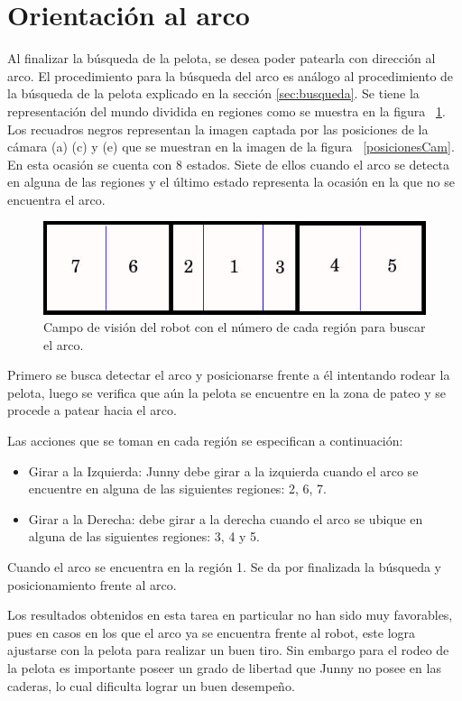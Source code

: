 \section{Orientaci\'on al arco}

Al finalizar la búsqueda de la pelota, se desea poder patearla con dirección al arco. El procedimiento para la búsqueda del arco es an\'alogo al procedimiento de la b\'usqueda de la pelota explicado en la sección \ref{sec:busqueda}.
Se tiene la representación del mundo dividida en regiones como se muestra en la figura ~\ref{divisionCamArco}. Los recuadros negros representan la imagen captada por las posiciones de la cámara (a) (c) y (e) que se muestran en la imagen de la figura ~\ref{posicionesCam}. En esta ocasi\'on se cuenta con 8 estados. Siete de ellos cuando el arco se detecta en alguna de las regiones y el último estado representa la ocasión en la que no se encuentra el arco. 

\begin{figure}[hbtp]
\centering
\includegraphics[scale=0.5]{imagenes/RegionesArco.jpg}
\caption{Campo de visión del robot con el número de cada región para buscar el arco. }
\label{divisionCamArco}
\end{figure}

Primero se busca detectar el arco y posicionarse frente a él intentando rodear la pelota, luego se verifica que a\'un la pelota se encuentre en la zona de pateo y se procede a patear hacia el arco.

Las acciones que se toman en cada regi\'on se especifican a continuación: 
 \begin{itemize}
\item Girar a la Izquierda: Junny debe girar a la izquierda cuando el arco se encuentre en alguna de las siguientes regiones: 2, 6, 7.

\item Girar a la Derecha: debe girar a la derecha cuando el arco se ubique en alguna de las siguientes regiones: 3, 4 y 5. 
\end{itemize}

Cuando el arco se encuentra en la regi\'on 1. Se da por finalizada la búsqueda y posicionamiento frente al arco.  

Los resultados obtenidos en esta tarea en particular no han sido muy favorables, pues en casos en los que el arco ya se encuentra frente al robot, este logra ajustarse con la pelota para realizar un buen tiro. Sin embargo para el rodeo de la pelota es importante poseer un grado de libertad que Junny no posee en las caderas, lo cual dificulta lograr un buen desempeño.






